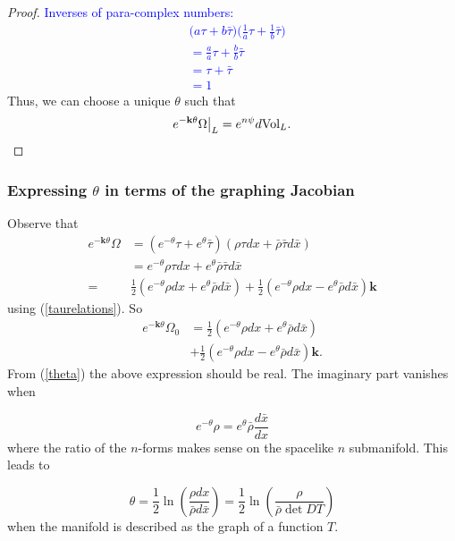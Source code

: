 \documentclass[12pt,letterpaper]{amsart}%
\numberwithin{mycounter}{section}
\theoremstyle{plain}
\numberwithin{equation}{section}
\theoremstyle{definition}
\begin{document}
\begin{proof}
\textcolor{blue}{Inverses of para-complex numbers:
\begin{align}
    &\Big(a\tau+b\bar\tau\Big)\Big(\frac{1}{a}\tau+\frac{1}{b}\bar\tau\Big) \\
    &=\frac{a}{a}\tau+\frac{b}{b}\bar\tau \\
    &=\tau+\bar\tau \\
    &=1
\end{align}
}
\fi 
Thus, we can choose a unique $\theta$ such that 
\begin{equation*}
    e^{{-\bf k}\theta}\Omega\big|_L = e^{n\psi}d\textrm{Vol}_L.
\end{equation*}  
\end{proof}  

\subsubsection{Expressing $\theta$ in terms of the graphing Jacobian}
Observe that 
\begin{align*}
e^{-\mathbf{k}\theta}\Omega  & =\left(  e^{-\theta}\tau+e^{\theta}%
\bar{\tau}\right)  \left(  \rho\tau dx+\bar{\rho}\bar{\tau}d\bar{x}\right)
\\
& =e^{-\theta}\rho\tau dx+e^{\theta}\bar{\rho}\bar{\tau}d\bar{x}%
\\  = & \frac{1}{2}\left(  e^{-\theta}\rho
dx+e^{\theta}\bar{\rho}d\bar{x}\right)
+\frac{1}{2}\left(  e^{-\theta}\rho dx-e^{\theta}\bar{\rho}d\bar{x}\right)
\mathbf{k}%
\end{align*}
using (\ref{taurelations}). 
So
\begin{align*}
e^{-\mathbf{k}\theta}\Omega_{0}  & =\frac{1}{2}\left(  e^{-\theta}\rho
dx+e^{\theta}\bar{\rho}d\bar{x}\right)  \\
& +\frac{1}{2}\left(  e^{-\theta}\rho dx-e^{\theta}\bar{\rho}d\bar{x}\right)
\mathbf{k}.%
\end{align*}  From (\ref{theta}) the above expression should be real.  The imaginary part vanishes when

\begin{equation}
e^{-\theta}\rho=e^{\theta}\bar{\rho}\frac{d\bar{x}}{dx}  \label{theta defined here}
\end{equation}
where the ratio of the $n$-forms makes sense on the spacelike $n$ submanifold. This leads to 

\[
\theta=\frac{1}{2}\ln\left(  \frac{\rho dx}{\bar{\rho}d \bar{x} }\right)=\frac{1}{2}\ln\left(  \frac{\rho}{\bar{\rho}\det DT}\right)
\] when the manifold is described as the graph of a function $T.$
\end{document}
